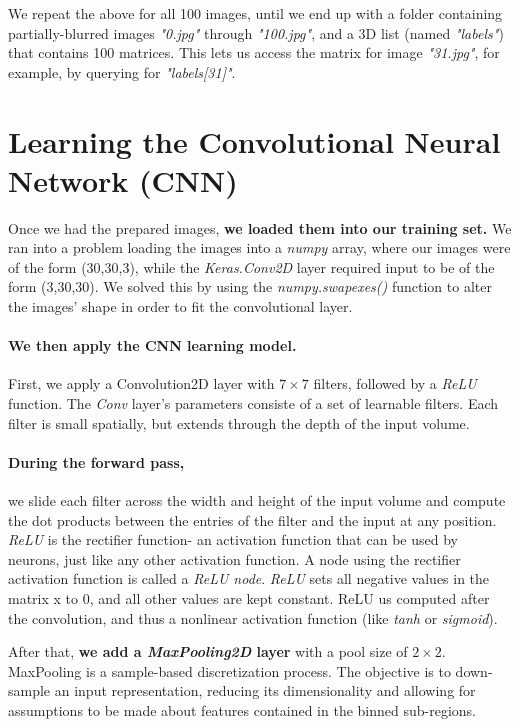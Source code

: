 \documentclass{article}
\begin{document}
We repeat the above for all 100 images, until we end up with a folder containing 
partially-blurred images \textit{"0.jpg"} through \textit{"100.jpg"}, and a 3D list 
(named \textit{"labels"}) that contains 100 matrices. This lets us access the matrix for 
image \textit{"31.jpg"}, for example, by querying for \textit{"labels[31]"}.

\section{Learning the Convolutional Neural Network (CNN)}
Once we had the prepared images, \textbf{we loaded them into our training set.} We ran 
into a problem loading the images into a \textit{numpy} array, where our images were of 
the form (30,30,3), while the \textit{Keras.Conv2D} layer required input to be of the form 
(3,30,30). We solved this by using the \textit{numpy.swapexes()} function to alter the 
images' shape in order to fit the convolutional layer.

\paragraph{We then apply the CNN learning model.}
First, we apply a Convolution2D layer with $7\times7$ filters, followed by a \textit{ReLU} 
function. The \textit{Conv} layer's parameters consiste of a set of learnable filters. 
Each filter is small spatially, but extends through the depth of the input volume. 

\paragraph{During the forward pass,} 
we slide each filter across the width and height of the input 
volume and compute the dot products between the entries of the filter and the input at 
any position. \textit{ReLU} is the rectifier function- an activation function that can be 
used by neurons, just like any other activation function. A node using the rectifier 
activation function is called a \textit{ReLU node}. \textit{ReLU} sets all negative values 
in the matrix x to 0, and all other values are kept constant. ReLU us computed after the 
convolution, and thus a nonlinear activation function (like \textit{tanh} or 
\textit{sigmoid}).

After that, \textbf{we add a \textit{MaxPooling2D} layer} with a pool size of $2\times2$. 
MaxPooling is a sample-based discretization process. The objective is to down-sample an 
input representation, reducing its dimensionality and allowing for assumptions to be made 
about features contained in the binned sub-regions. 
\end{document}
